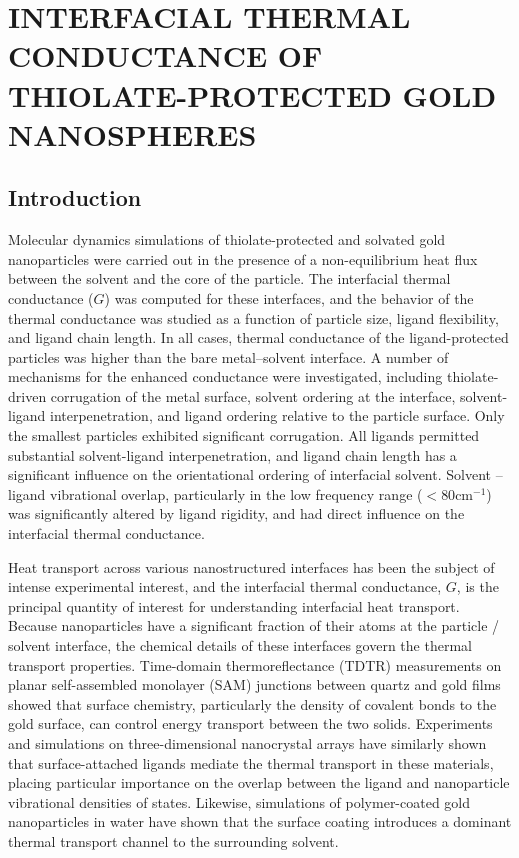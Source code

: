 
\chapter{INTERFACIAL THERMAL CONDUCTANCE OF THIOLATE-PROTECTED GOLD NANOSPHERES}\label{chap:npthiols}
\section{Introduction}
  Molecular dynamics simulations of thiolate-protected and solvated gold nanoparticles were carried out in the presence of a non-equilibrium heat flux between the solvent and the core of the particle. The interfacial thermal conductance ($G$) was computed for these interfaces, and the behavior of the thermal conductance was studied as a function of particle size, ligand flexibility, and ligand chain length. In all cases, thermal conductance of the ligand-protected particles was higher than the bare metal--solvent interface.  A number of mechanisms for the enhanced conductance were investigated, including thiolate-driven corrugation of the metal surface, solvent ordering at the interface, solvent-ligand interpenetration, and ligand ordering relative to the particle
  surface. Only the smallest particles exhibited significant
  corrugation.  All ligands permitted substantial solvent-ligand
  interpenetration, and ligand chain length has a significant
  influence on the orientational ordering of interfacial solvent.
  Solvent -- ligand vibrational overlap, particularly in the low
  frequency range ($< 80 \mathrm{cm}^{-1}$) was significantly altered
  by ligand rigidity, and had direct influence on the interfacial
  thermal conductance.


Heat transport across various nanostructured interfaces has been the
subject of intense experimental
interest,\cite{Wilson:2002uq,Ge:2004yg,Shenogina:2009ix,Wang10082007,Schmidt:2008ad,Juve:2009pt,Alper:2010pd,Harikrishna:2013ys}
and the interfacial thermal conductance, $G$, is the principal
quantity of interest for understanding interfacial heat
transport.\cite{Cahill:2003fk} 
Because nanoparticles have a
significant fraction of their atoms at the particle / solvent
interface, the chemical details of these interfaces govern the thermal
transport properties.  Time-domain thermoreflectance (TDTR)
measurements on planar self-assembled monolayer (SAM) junctions
between quartz and gold films showed that surface chemistry,
particularly the density of covalent bonds to the gold surface, can
control energy transport between the two solids.\cite{Losego:2012fr}
Experiments and simulations on three-dimensional nanocrystal arrays
have similarly shown that surface-attached ligands mediate the thermal
transport in these materials, placing particular importance on the
overlap between the ligand and nanoparticle vibrational densities of
states.\cite{Ong:2013rt,Ong:2014yq} Likewise, simulations of
polymer-coated gold nanoparticles in water have shown that the surface
coating introduces a dominant thermal transport channel to the
surrounding solvent.\cite{Soussi:2015fj}

